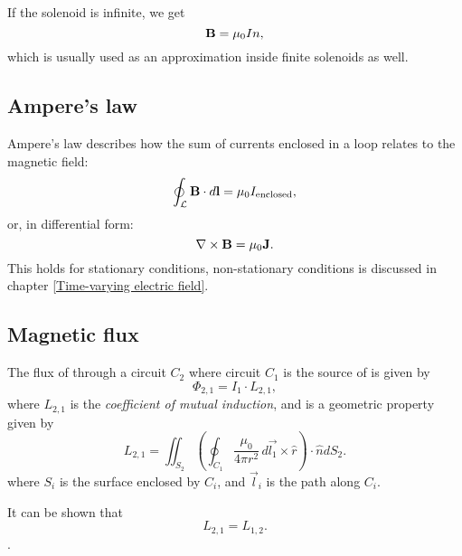         If the solenoid is infinite, we get
        \begin{equation}
            \mathbf{B} = \mu_0 In,
        \end{equation}
        which is usually used as an approximation inside finite solenoids as well.

\subsection{Ampere's law}
    Ampere's law describes how the sum of currents enclosed in a loop relates to the magnetic field: 
    \begin{equation}
        \oint_\mathcal{L}\mathbf{B}\cdot d\mathbf{l} = \mu_0 I_{\text{enclosed}},
    \end{equation}
    or, in differential form: 
    \begin{equation}
        \nabla\times\mathbf{B} = \mu_0\mathbf{J}.
    \end{equation}
    This holds for stationary conditions, non-stationary conditions is discussed in chapter \ref{Time-varying electric field}. 

\subsection{Magnetic flux} \label{Magnetic flux}
    The flux of \B{} through a circuit $C_2$ where circuit $C_1$ is the source of \B{} is given by
    \begin{equation}
        \Phi_{2,1} = I_1 \cdot L_{2,1},
    \end{equation}
    where $L_{2,1}$ is the \textit{coefficient of mutual induction}, and is a geometric property given by
    \begin{equation}
        L_{2,1} = \iint_{S_2} \left(\oint_{C_1}\frac{\mu_0}{4\pi r^2}\,d\vec{l_1}\times \hat{r} \right)\cdot \hat{n} dS_2.
    \end{equation}
    where $S_i$ is the surface enclosed by $C_i$, and $\vec{l}_i$ is the path along $C_i$.

    It can be shown that 
    \begin{equation}
        L_{2,1} = L_{1,2}.
    \end{equation}.

